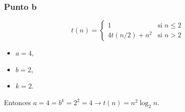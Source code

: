 \subsubsection{Punto b}
\begin{equation*}
    t(n) = \begin{cases}
        1 & \text{si } n \leq 2 \\
        4t(n/2) + n^2 & \text{si } n > 2
    \end{cases}
\end{equation*}

\begin{itemize}
    \item $a = 4$,
    \item $b = 2$,
    \item $k = 2$.
\end{itemize}

Entonces $a = 4 = b^k = 2^2 = 4 \rightarrow t(n) = n^2 \log_2 n$.